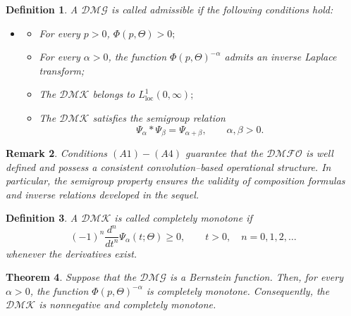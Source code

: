\documentclass[11pt]{article}
\numberwithin{equation}{section}
\newtheorem{definition}{Definition}[section]
\newtheorem{theorem}[definition]{Theorem}
\newtheorem{remark}[definition]{Remark}
\begin{document}

\begin{definition}
A $\mathcal{DMG}$ 
is called admissible if the following conditions hold:

\begin{itemize}[itemsep=2pt,topsep=2pt]
\item[]
\begin{itemize}

\item[(A1)]
For every \(p>0\),
\(
\Phi(p,\Theta)>0;
\)

\item[(A2)]
For every \(\alpha>0\), the function
\(
\Phi(p,\Theta)^{-\alpha}
\)
admits an inverse Laplace transform;

\item[(A3)]
The $\mathcal{DMK}$
belongs to
\(
L_{\mathrm{loc}}^{1}(0,\infty);
\)

\item[(A4)]
The $\mathcal{DMK}$ satisfies the semigroup relation
\[
\Psi_\alpha * \Psi_\beta
=
\Psi_{\alpha+\beta},
\qquad
\alpha,\beta>0.
\]

\end{itemize}
\end{itemize}

\end{definition}


\begin{remark}
Conditions \((A1)-(A4)\) guarantee that the $\mathcal{DMFO}$
is  well defined and possess a consistent convolution--based operational
structure. In particular, the semigroup property ensures the validity of
composition formulas and inverse relations developed in the sequel.
\end{remark}


\begin{definition}
A $\mathcal{DMK}$
is called completely monotone if
\[
(-1)^n
\frac{d^n}{dt^n}
\Psi_\alpha(t;\Theta)
\ge0,
\qquad
t>0,
\quad
n=0,1,2,\ldots
\]
whenever the derivatives exist.
\end{definition}


\begin{theorem}
Suppose that the $\mathcal{DMG}$
is a Bernstein function. Then, for every \(\alpha>0\), the function
\(
\Phi(p,\Theta)^{-\alpha}
\)
is completely monotone. Consequently, the $\mathcal{DMK}$
is nonnegative and completely monotone.
\end{theorem}
\end{document}
